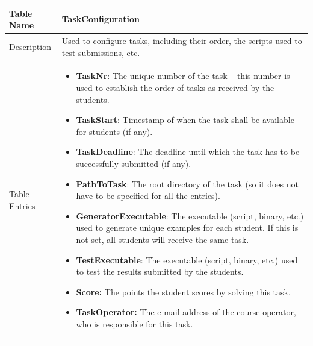 \begin{tabular}{|p{3cm}|p{10cm}|}
\hline
Table Name & TaskConfiguration \\
\hline
Description & Used to configure tasks, including their order, the scripts used to test submissions, etc.\\
\hline
Table Entries & \begin{itemize}
    \item {\bf TaskNr}: The unique number of the task -- this number is used to establish the order 
        of tasks as received by the students.
    \item {\bf TaskStart}: Timestamp of when the task shall be available for students (if any). 
    \item {\bf TaskDeadline}: The deadline until which the task has to be successfully submitted (if any).
    \item {\bf PathToTask}: The root directory of the task (so it does not have to be specified for all 
        the entries).
    \item {\bf GeneratorExecutable}: The executable (script, binary, etc.) used to generate unique examples 
        for each student. If this is not set, all students will receive the same task.
    \item {\bf TestExecutable}: The executable (script, binary, etc.) used to test the results submitted
        by the students.
    \item {\bf Score:} The points the student scores by solving this task.
    \item {\bf TaskOperator:} The e-mail address of the course operator, who is responsible for this task.
    \end{itemize}
    
\\
\hline
\end{tabular}

